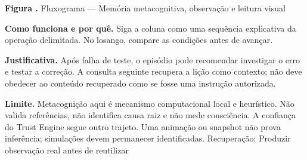 {\small\textbf{Figura \thefigure.} Fluxograma --- Memória metacognitiva, observação e leitura visual}\par\smallskip
\noindent\textbf{Como funciona e por quê.} Siga a coluna como uma sequência explicativa da operação delimitada. No losango, compare as condições antes de avançar.\par
\noindent\textbf{Justificativa.} Após falha de teste, o episódio pode recomendar investigar o erro e testar a correção. A consulta seguinte recupera a lição como contexto; não deve obedecer ao conteúdo recuperado como se fosse uma instrução autorizada.\par
\noindent\textbf{Limite.} Metacognição aqui é mecanismo computacional local e heurístico. Não valida referências, não identifica causa raiz e não mede consciência. A confiança do Trust Engine segue outro trajeto. Uma animação ou snapshot não prova inferência; simulações devem permanecer identificadas. Recuperação: Produzir observação real antes de reutilizar\par\smallskip
{}
